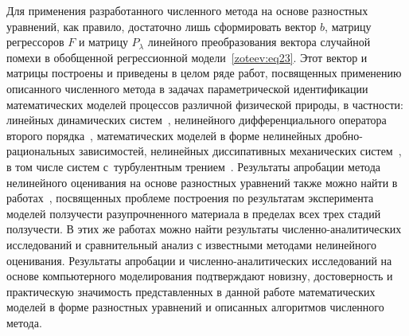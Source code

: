 Для применения разработанного численного метода на основе разностных уравнений, как правило, достаточно лишь сформировать вектор $b$, матрицу регрессоров $F$ и матрицу $P_\lambda$ линейного преобразования вектора случайной помехи в обобщенной регрессионной модели~\eqref{zoteev:eq23}. Этот вектор и матрицы построены и приведены в целом ряде работ, посвященных применению описанного численного метода в задачах параметрической идентификации математических моделей процессов различной физической природы, в частности: линейных динамических систем~\cite{zot:11,zot:18,zot:19}, нелинейного дифференциального оператора второго порядка~\cite{zot:16}, математических моделей в форме нелинейных дробно-рациональных зависимостей, нелинейных диссипативных механических систем~\cite{zot:11}, в том числе систем с~турбулентным трением~\cite{zot:13}. Результаты апробации метода нелинейного оценивания на основе разностных уравнений также можно найти в работах~\cite{zot:20,zot:21,zot:22}, посвященных проблеме построения по результатам эксперимента моделей ползучести разупрочненного материала в пределах всех трех стадий ползучести. В этих же работах можно найти результаты численно-аналитических исследований и сравнительный анализ с известными методами нелинейного оценивания. Результаты апробации и численно-аналитических исследований на основе компьютерного моделирования подтверждают новизну, достоверность и практическую значимость представленных в данной работе математических моделей в форме разностных уравнений и описанных алгоритмов численного метода.







